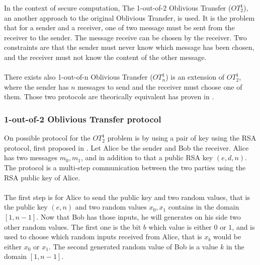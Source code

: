 \documentclass[11pt,a4paper]{article}
\begin{document}
In the context of secure computation,
The 1-out-of-2 Oblivious Transfer ($OT^1_2$),
an another approach to the original Oblivious Transfer, is used.
It is the problem
that for a sender and a receiver, one of two message must be sent
from the receiver to the sender. The message receive can be chosen
by the receiver. Two constraints are that the sender must never know
which message has been chosen, and the receiver must not know
the content of the other message.

\paragraph{}


There exists also
1-out-of-n Oblivious Transfer ($OT^1_n$) is an extension of $OT^1_2$,
where the sender has $n$ messages to send and the receiver must choose
one of them. Those two protocols are theorically equivalent
has proven in \cite{goos_equivalence_1988, goos_foundations_1998}.


\subsubsection{1-out-of-2 Oblivious Transfer protocol}

\label{sec:ot}

On possible protocol for the $OT^1_2$ problem is by using a pair of
key using the RSA protocol, first proposed in \cite{even_randomized_1985}.
Let Alice be the sender and Bob the receiver.
Alice has two messages $m_0,m_1$, and in addition to that
a public RSA key $(e, d, n)$. The protocol is a multi-step
communication between the two parties using the RSA public key
of Alice.

\paragraph{}

The first step is for Alice
to send the public key and two random values, that is
the public key $(e, n)$ and two random values $x_0, x_1$
contains in the domain $[1, n-1]$. Now that Bob has those inputs,
he will generates on his side two other random values.
The first one is the bit $b$ which value is either $0$ or $1$,
and is used to choose which random inputs received from Alice,
that is $x_b$ would be either $x_0$ or $x_1$. The second
generated random value of Bob is a value $k$ in the domain
$[1, n-1]$.

\paragraph{}
\end{document}
